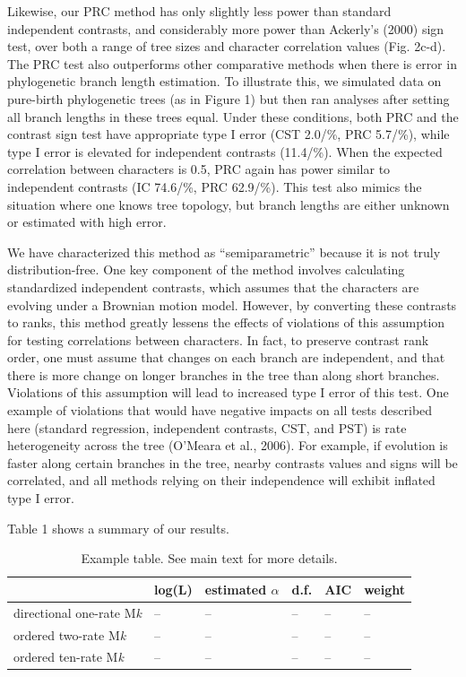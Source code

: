 \documentclass[fleqn,10pt,lineno]{wlpeerj} %
\begin{document}
Likewise, our PRC method has only slightly less power than standard independent contrasts, and considerably more power than Ackerly's (2000) sign test, over both a range of tree sizes and character correlation values (Fig. 2c-d). The PRC test also outperforms other comparative methods when there is error in phylogenetic branch length estimation. To illustrate this, we simulated data on pure-birth phylogenetic trees (as in Figure 1) but then ran analyses after setting all branch lengths in these trees equal. Under these conditions, both PRC and the contrast sign test have appropriate type I error (CST 2.0/\%, PRC 5.7/\%), while type I error is elevated for independent contrasts (11.4/\%). When the expected correlation between characters is 0.5, PRC again has power similar to independent contrasts (IC 74.6/\%, PRC 62.9/\%). This test also mimics the situation where one knows tree topology, but branch lengths are either unknown or estimated with high error.

We have characterized this method as ``semiparametric'' because it is not truly distribution-free. One key component of the method involves calculating standardized independent contrasts, which assumes that the characters are evolving under a Brownian motion model. However, by converting these contrasts to ranks, this method greatly lessens the effects of violations of this assumption for testing correlations between characters. In fact, to preserve contrast rank order, one must assume that changes on each branch are independent, and that there is more change on longer branches in the tree than along short branches. Violations of this assumption will lead to increased type I error of this test. One example of violations that would have negative impacts on all tests described here (standard regression, independent contrasts, CST, and PST) is rate heterogeneity across the tree (O'Meara et al., 2006). For example, if evolution is faster along certain branches in the tree, nearby contrasts values and signs will be correlated, and all methods relying on their independence will exhibit inflated type I error.

Table 1 shows a summary of our results.

\begin{table}

\caption{\label{tab:unnamed-chunk-2}Example table. See main text for more details.}
\centering
\begin{tabular}[t]{l|l|l|l|l|l}
\hline
  & log(L) & estimated $\alpha$ & d.f. & AIC & weight\\
\hline
directional one-rate M\emph{k} & -- & -- & -- & -- & --\\
\hline
ordered two-rate M\emph{k} & -- & -- & -- & -- & --\\
\hline
ordered ten-rate M\emph{k} & -- & -- & -- & -- & --\\
\hline
\end{tabular}
\end{table}
\end{document}
